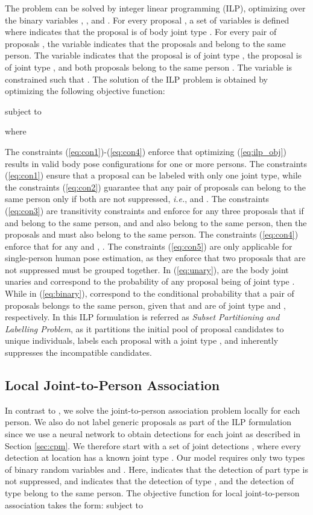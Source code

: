 \documentclass[runningheads]{llncs}
\newcommand{\ie}{\mbox{\emph{i.e.}}}
\begin{document}
The problem can be solved by integer linear programming (ILP), optimizing over the binary variables , , and . For every proposal , a set of variables  is defined where  indicates that the proposal  is of body joint type . For every pair of proposals , the variable  indicates that the proposals  and  belong to the same person. The variable  indicates that the proposal  is of  joint type , the proposal  is of joint type , and both proposals belong to the same person . The variable  is constrained such that . The solution of the ILP problem is obtained by optimizing the following objective function: 

subject to 

where

The constraints (\ref{eq:con1})-(\ref{eq:con4}) enforce that optimizing (\ref{eq:ilp_obj}) results in valid body pose configurations for one or more persons. The constraints (\ref{eq:con1}) ensure that a proposal  can be labeled with only one joint type, while the constraints (\ref{eq:con2}) guarantee that any pair of proposals  can belong to the same person only if both are not suppressed, \ie,  and . The constraints (\ref{eq:con3}) are transitivity constraints and enforce for any three proposals  that if  and  belong to the same person, and  and  also belong to the same person, then the proposals  and  must also belong to the same person. The constraints (\ref{eq:con4}) enforce that for any  and , . The constraints (\ref{eq:con5}) are only applicable for single-person human pose estimation, as they enforce that two proposals  that are not suppressed must be grouped together.  In (\ref{eq:unary}),  are the body joint unaries and correspond to the probability of any proposal  being of joint type .  While in (\ref{eq:binary}),  correspond to the conditional probability that a pair of proposals  belongs to the same person, given that  and  are of joint type  and , respectively. In \cite{pishchulin2015deepcut} this ILP formulation is referred as \textit{Subset Partitioning and Labelling Problem}, as it partitions the initial pool of proposal candidates to unique individuals, labels each proposal with a joint type , and inherently suppresses the incompatible candidates. 

\subsection{Local Joint-to-Person Association}
\label{sec:local_joint_to_person_association}

In contrast to \cite{pishchulin2015deepcut}, we solve the joint-to-person association problem locally for each person. We also do not label generic proposals as part of the ILP formulation since we use a neural network to obtain detections for each joint as described in Section \ref{sec:cpm}.
We therefore start with a set of joint detections , where every detection  at location  has a known joint type . Our model requires only two types of binary random variables  and  . Here,  indicates that the detection  of part type  is not suppressed, and   indicates that the detection  of type , and the detection  of type  belong to the same person. The objective function for local joint-to-person association takes the form: 
subject to
\end{document}
